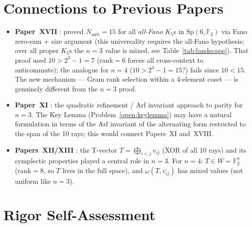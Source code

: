 \documentclass[11pt,a4paper]{article}
\theoremstyle{remark}
\newcommand{\Sp}{\mathrm{Sp}}
\begin{document}
\section{Connections to Previous Papers}\label{sec:connections}

\begin{itemize}
  \item \textbf{Paper~XVII} \cite{PaperXVII}: proved $N_{\mathrm{anti}} = 15$ for all
        \emph{all-Fano} $K_5$s in $\Sp(6,\mathbb{F}_2)$ via Fano zero-sum + size argument
        (this universality requires the all-Fano hypothesis; over all proper $K_5$s
        the $n=3$ value is mixed, see Table~\ref{tab:landscape}).
        That proof used $10 > 2^3 - 1 = 7$ (rank$=6$ forces all cross-context to anticommute);
        the analogue for $n=4$ ($10 > 2^4-1 = 15$?) fails since $10 < 15$.
        The new mechanism --- Gram rank selection within a 4-element coset --- is genuinely
        different from the $n=3$ proof.
  \item \textbf{Paper~XI} \cite{PaperXI}: the quadratic refinement / Arf invariant approach
        to parity for $n=3$.
        The Key Lemma (Problem~\ref{open:keylemma}) may have a natural formulation
        in terms of the Arf invariant of the alternating form restricted to the
        span of the 10 rays; this would connect Papers~XI and~XVIII.
  \item \textbf{Papers~XII/XIII} \cite{PaperXII,PaperXIII}: the T-vector
        $T = \bigoplus_{i<j} v_{ij}$ (XOR of all 10 rays) and its symplectic
        properties played a central role in $n=3$.
        For $n=4$: $T \in W = \mathbb{F}_2^8$ (rank$=8$, so $T$ lives in the full space),
        and $\omega(T, v_{ij})$ has mixed values (not uniform like $n=3$).
\end{itemize}


\section{Rigor Self-Assessment}\label{sec:rigor}
\end{document}
